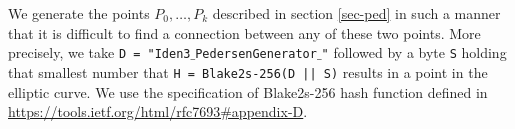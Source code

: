 {\color{blue}{Barry!}}
We generate the points $P_0,\dots,P_k$ described in section \ref{sec-ped} in such a manner that it is difficult to find a connection between any of these two points. 
More precisely, we take 
	\texttt{D =  "Iden3$\_$PedersenGenerator$\_$"} 
followed by a byte 
	\texttt{S} 
holding that smallest number that 
	\texttt{H = Blake2s-256(D || S)} 
results in a point in the elliptic curve. We use the specification of Blake2s-256 hash function defined in
	\url{https://tools.ietf.org/html/rfc7693#appendix-D}.

